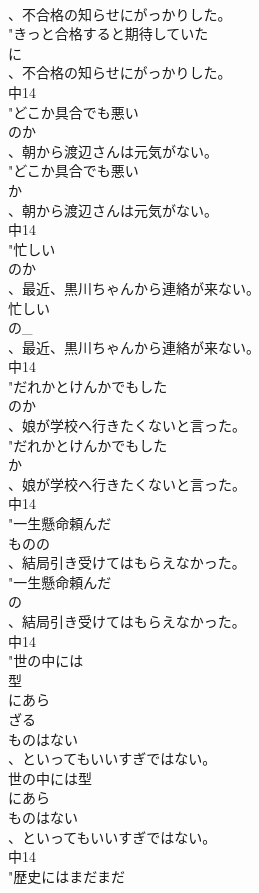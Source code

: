 \documentclass[8pt]{extreport}
\begin{document}
\begin{CJK}{UTF8}{min}
\\	、不合格の知らせにがっかりした。
\\	"きっと合格すると期待していた
\\	に
\\	、不合格の知らせにがっかりした。
\\	中14
\\	"どこか具合でも悪い
\\	のか
\\	、朝から渡辺さんは元気がない。
\\	"どこか具合でも悪い
\\	か
\\	、朝から渡辺さんは元気がない。
\\	中14
\\	"忙しい
\\	のか
\\	、最近、黒川ちゃんから連絡が来ない。
\\	忙しい
\\	の_
\\	、最近、黒川ちゃんから連絡が来ない。
\\	中14
\\	"だれかとけんかでもした
\\	のか
\\	、娘が学校へ行きたくないと言った。
\\	"だれかとけんかでもした
\\	か
\\	、娘が学校へ行きたくないと言った。
\\	中14
\\	"一生懸命頼んだ
\\	ものの
\\	、結局引き受けてはもらえなかった。
\\	"一生懸命頼んだ
\\	の
\\	、結局引き受けてはもらえなかった。
\\	中14
\\	"世の中には
\\	型
\\	にあら
\\	ざる
\\	ものはない
\\	、といってもいいすぎではない。
\\	世の中には型
\\	にあら
\\	ものはない
\\	、といってもいいすぎではない。
\\	中14
\\	"歴史にはまだまだ

\end{CJK}
\end{document}
